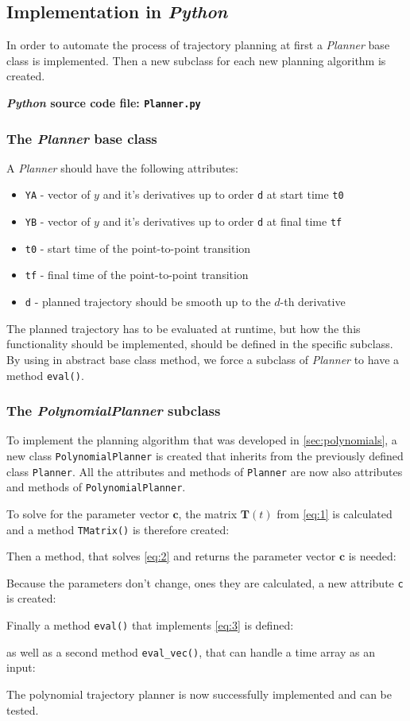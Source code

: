\documentclass[a4paper,11pt,headings=standardclasses,parskip=half]{scrartcl}
\newcommand{\listcode}[3]{}
\newcommand{\listcodeplanner}[2]{\listcode{#1}{#2}{../sim/Planner.py}}
\newcommand{\py}{\emph{Python}\xspace}
\begin{document}
\subsection{Implementation in \py}
In order to automate the process of trajectory planning at first a \emph{Planner} base class is implemented. Then a new subclass for each new planning algorithm is created.

\textbf{\py source code file: \texttt{Planner.py}}
\subsubsection{The \emph{Planner} base class}
A \emph{Planner} should have the following attributes:
\begin{itemize}
	\item[] \texttt{YA} - vector of $y$ and it's derivatives up to order \texttt{d} at start time \texttt{t0}
	\item[] \texttt{YB} - vector of $y$ and it's derivatives up to order \texttt{d} at final time \texttt{tf}
	\item[] \texttt{t0} - start time of the point-to-point transition
	\item[] \texttt{tf} - final time of the point-to-point transition
	\item[] \texttt{d} - planned trajectory should be smooth up to the $d$-th derivative
\end{itemize}
The planned trajectory has to be evaluated at runtime, but how the this functionality should be implemented, should be defined in the specific subclass. By using in abstract base class method, we force a subclass of \emph{Planner} to have a method \texttt{eval()}.
\listcodeplanner{2}{27}
\subsubsection{The \emph{PolynomialPlanner} subclass}
\label{sec:polynomialplanner}
To implement the planning algorithm that was developed in \autoref{sec:polynomials}, a new class \texttt{PolynomialPlanner} is created that inherits from the previously defined class \texttt{Planner}. All the attributes and methods of \texttt{Planner} are now also attributes and methods of \texttt{PolynomialPlanner}.
\listcodeplanner{28}{33}
To solve for the parameter vector $\mathbf{c}$, the matrix $\mathbf{T}(t)$ from \eqref{eq:1} is calculated and a method \texttt{TMatrix()} is therefore created:
\listcodeplanner{73}{94}
Then a method, that solves \eqref{eq:2} and returns the parameter vector $\mathbf{c}$ is needed:
\listcodeplanner{97}{116}
Because the parameters don't change, ones they are calculated, a new attribute \texttt{c} is created:
\listcodeplanner{35}{79}
Finally a method \texttt{eval()} that implements \eqref{eq:3} is defined:
\listcodeplanner{39}{54}
as well as a second method \texttt{eval\_vec()}, that can handle a time array as an input:
\listcodeplanner{57}{70}
The polynomial trajectory planner is now successfully implemented and can be tested.
\end{document}
